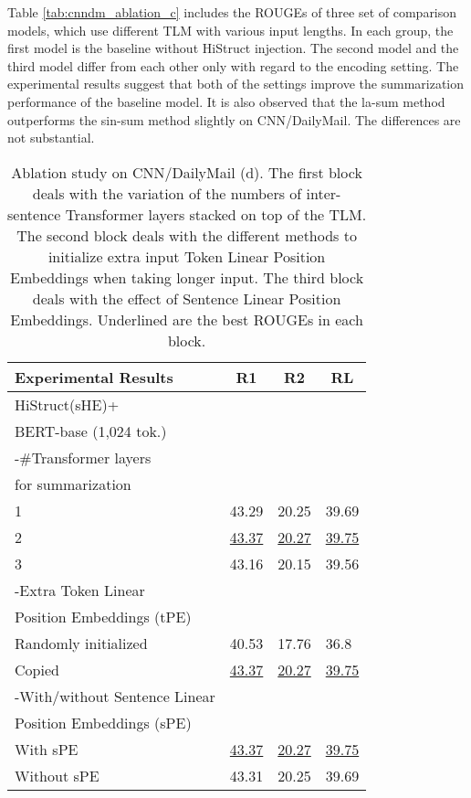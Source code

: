 \documentclass[11pt]{article}
\begin{document}
Table \ref{tab:cnndm_ablation_c} includes the ROUGEs of three set of comparison models, which use different TLM with various input lengths. In each group, the first model is the baseline without HiStruct injection. The second model and the third model differ from each other only with regard to the encoding setting. The experimental results suggest that both of the settings improve the summarization performance of the baseline model.
It is also observed that the la-sum method outperforms the sin-sum method slightly on CNN/DailyMail. The differences are not substantial.







\begin{table}[ht!]
\fontsize{9}{9}
\selectfont
\centering
\begin{tabular}{@{}llll@{}}
\toprule
Experimental Results & \multicolumn{1}{c}{R1} & \multicolumn{1}{c}{R2} & \multicolumn{1}{c}{RL} \\ \midrule
HiStruct(sHE)+ &&&\\
BERT-base (1,024 tok.) & & &  \\ \midrule
-\#Transformer layers \\
for summarization & & &         \\ \midrule
1                           & 43.29       & 20.25      & 39.69      \\
2                           & \underline{43.37}       & \underline{20.27}      & \underline{39.75}      \\
3                           & 43.16       & 20.15      & 39.56      \\ \midrule
-Extra Token Linear \\ Position Embeddings (tPE) & & &     \\ \midrule
Randomly initialized        & 40.53       & 17.76      & 36.8       \\
Copied                      & \underline{43.37}       & \underline{20.27}      & \underline{39.75}  \\ \midrule
-With/without Sentence Linear \\ Position Embeddings (sPE) & & &  \\ \midrule
With sPE                    & \underline{43.37}       & \underline{20.27}      & \underline{39.75}      \\
Without sPE                 & 43.31       & 20.25      & 39.69      \\ \bottomrule
\end{tabular}
\caption[Ablation study on CNN/DailyMail (d)]{Ablation study on CNN/DailyMail (d). The first block deals with the variation of the numbers of inter-sentence Transformer layers stacked on top of the TLM. The second block deals with the different methods to initialize extra input Token Linear Position Embeddings when taking longer input. The third block deals with the effect of Sentence Linear Position Embeddings. Underlined are the best ROUGEs in each block. }
\label{tab:cnndm_ablation_d}
\end{table}
\end{document}

